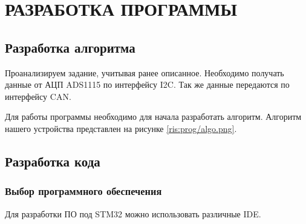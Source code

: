 \begin{sloppypar} %
\newpage %
\section{РАЗРАБОТКА ПРОГРАММЫ} %
\subsection{Разработка алгоритма}

Проанализируем задание, учитывая ранее описанное. Необходимо получать данные от АЦП ADS1115 по интерфейсу I2C. Так же данные передаются по интерфейсу CAN.


Для работы программы необходимо для начала разработать алгоритм. Алгоритм нашего устройства представлен на рисунке \ref{ris:prog/algo.png}.











\subsection{Разработка кода}

\subsubsection{Выбор программного обеспечения}
Для разработки ПО под STM32 можно использовать различные IDE. 


\end{sloppypar}
